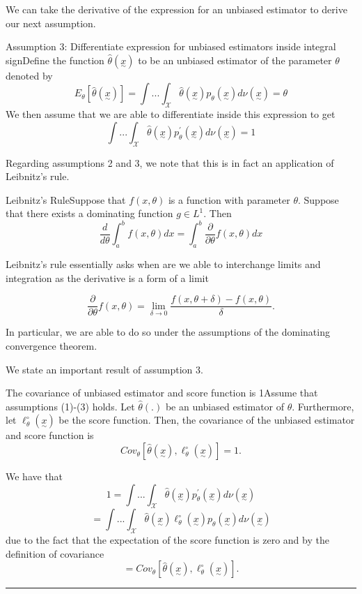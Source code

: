 \documentclass[twoside]{article}
\newenvironment{proof}{{\bf Proof:}}{\hfill\rule{2mm}{2mm}}
\newcommand{\utilde}{\underset{\sim}}
\begin{document}
We can take the derivative of the expression for an unbiased estimator to derive our next assumption.

\begin{definition_exam}{Assumption 3: Differentiate expression for unbiased estimators inside integral sign}{}Define the function $\hat{\theta}(\utilde{x})$ to be an unbiased estimator of the parameter $\theta$ denoted by 
$$
E_{\theta}[\hat{\theta}(\utilde{x})] = \int ... \int_{\mathcal{X}}\hat{\theta}(\utilde{x})p_{\theta}(\utilde{x})d\nu(\utilde{x}) = \theta
$$
We then assume that we are able to differentiate inside this expression to get 
$$
\int ... \int_{\mathcal{X}}\hat{\theta}(\utilde{x})p_{\theta}^{'}(\utilde{x})d\nu(\utilde{x}) = 1
$$
\end{definition_exam}

Regarding assumptions 2 and 3, we note that this is in fact an application of Leibnitz's rule.
\begin{proposition_exam}{Leibnitz's Rule}{}Suppose that $f(x,\theta)$ is a function with parameter $\theta.$ Suppose that there exists a dominating function $g \in L^1.$ Then 
$$
\frac{d}{d\theta}\int_a^b f(x,\theta)dx = \int_a^b \frac{\partial}{\partial \theta}f(x,\theta)dx
$$
\end{proposition_exam}

Leibnitz's rule essentially asks when are we able to interchange limits and integration as the derivative is a form of a limit 

$$
\frac{\partial}{\partial \theta}f(x,\theta) = \lim_{\delta \rightarrow 0}\frac{f(x, \theta + \delta) - f(x, \theta)}{\delta}.
$$

In particular, we are able to do so under the assumptions of the dominating convergence theorem.

We state an important result of assumption 3.

\begin{proposition_exam}{The covariance of unbiased estimator and score function is 1}{}Assume that assumptions (1)-(3) holds. Let $\hat{\theta}(.)$ be an unbiased estimator of $\theta.$ Furthermore, let $\ell_{\theta}^{\circ}(\utilde{x})$ be the score function. Then, the covariance of the unbiased estimator and score function is 
$$
Cov_{\theta}[\hat{\theta}(\utilde{x}), \ell_{\theta}^{\circ}(\utilde{x})] = 1.
$$
\end{proposition_exam}

\begin{proof} We have that 
$$
1 = \int ... \int_{\mathcal{X}}\hat{\theta}(\utilde{x})p_{\theta}^{'}(\utilde{x})d\nu(\utilde{x})
$$
$$
= \int ... \int_{\mathcal{X}}\hat{\theta}(\utilde{x})\ell_{\theta}^{\circ}(\utilde{x})p_{\theta}(\utilde{x})d\nu(\utilde{x})
$$
due to the fact that the expectation of the score function is zero and by the definition of covariance
$$
= Cov_{\theta}[\hat{\theta}(\utilde{x}), \ell_{\theta}^{\circ}(\utilde{x})].
$$
\end{proof}
\end{document}
